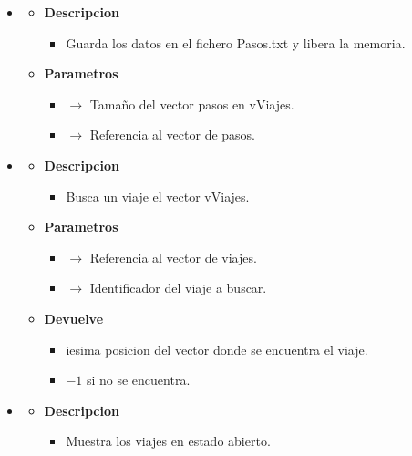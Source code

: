 \begin{itemize}
\begin{itemize}
	\end{itemize}
    \item \label{savevipa}
    \begin{itemize}
        \item \textbf{Descripcion}
        \begin{itemize}
			\item  Guarda los datos en el fichero Pasos.txt y libera la memoria.
		\end{itemize}
		\item \textbf{Parametros}
		\begin{itemize}
            \item {} $\rightarrow$ Tamaño del vector pasos en vViajes.
			\item {} $\rightarrow$ Referencia al vector de pasos.
		\end{itemize}
	\end{itemize}
    \newpage
    \item \label{findivi}
    \begin{itemize}
        \item \textbf{Descripcion}
        \begin{itemize}
			\item  Busca un viaje el vector vViajes.
		\end{itemize}
		\item \textbf{Parametros}
		\begin{itemize}
			\item {} $\rightarrow$ Referencia al vector de viajes.
            \item {} $\rightarrow$ Identificador del viaje a buscar.
		\end{itemize}
        \item \textbf{Devuelve}
		\begin{itemize}
			\item iesima posicion del vector donde se encuentra el viaje.
            \item $-1$ si no se encuentra.
		\end{itemize}
	\end{itemize}
    \item \label{listviopen}
    \begin{itemize}
        \item \textbf{Descripcion}
        \begin{itemize}
			\item  Muestra los viajes en estado abierto.

\end{itemize}
\end{itemize}
\end{itemize}
